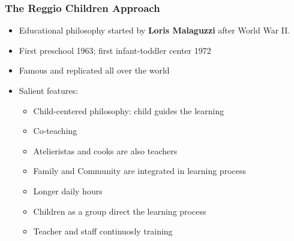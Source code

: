 \begin{frame}
\frametitle{The Reggio Children Approach}\label{frame:reggiostyle}
\begin{itemize}
	\item Educational philosophy started by \textbf{Loris Malaguzzi} after World War II.
	\item First preschool 1963; first infant-toddler center 1972 
	\item Famous and replicated all over the world
	\item Salient features:

		\begin{itemize}
		\item Child-centered philosophy: child guides the learning
		\item Co-teaching
		\item Atelieristas and cooks are also teachers
		\item Family and Community are integrated in learning process
		\item Longer daily hours
		\item Children as a group direct the learning process
		\item Teacher and staff continuosly training
		\end{itemize} 
\end{itemize} 
\end{frame} 
